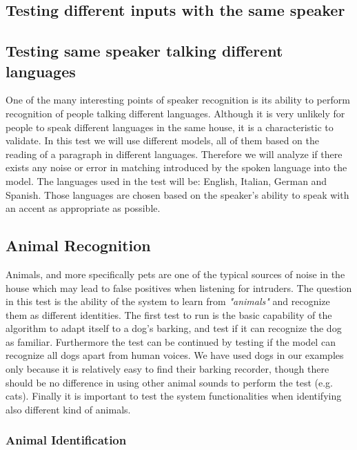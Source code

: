 \subsection{Testing different inputs with the same speaker}

\subsection{Testing same speaker talking different languages}

One of the many interesting points of speaker recognition is its ability to perform
recognition of people talking different languages. Although it is very unlikely
for people to speak different languages in the same house, it is a characteristic to
validate. In this test we will use different models, all of them based on the reading of a
paragraph in different languages. Therefore we will analyze if there exists any noise or error
in matching introduced by the spoken language into the model. The languages used in the test will be:
English, Italian, German and Spanish. Those languages are chosen based on the speaker's ability to
speak with an accent as appropriate as possible.

\subsection{Animal Recognition}

Animals, and more specifically pets are one of the typical sources of noise in the house
which may lead to false positives when listening for intruders. The question in this test
is the ability of the system to learn from \textit{"animals"} and recognize them as different identities.
The first test to run is the basic capability of the algorithm to adapt itself to a dog's barking,
and test if it can recognize the dog as familiar. Furthermore the test can be continued by testing
if the model can recognize all dogs apart from human voices. We have used dogs in our examples
only because it is relatively easy to find their barking recorder, though there should be no
difference in using other animal sounds to perform the test (e.g. cats).
Finally it is important to test
the system functionalities when identifying also different kind of animals.

\subsubsection{Animal Identification}

